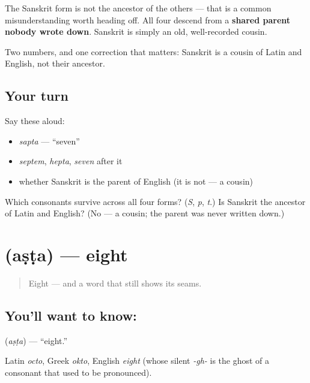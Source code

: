 The Sanskrit form is not the ancestor of the others — that is a common misunderstanding worth heading off. All four descend from a \textbf{shared parent nobody wrote down}. Sanskrit is simply an old, well-recorded cousin.

\begin{grammarlens}[title={What you've built}]
Two numbers, and one correction that matters: Sanskrit is a cousin of Latin and English, not their ancestor.
\end{grammarlens}

\subsection*{Your turn}
Say these aloud:

\begin{itemize}
\raggedright
  \item \emph{sapta} — \textquotedblleft{}seven\textquotedblright{}
  \item \emph{septem}, \emph{hepta}, \emph{seven} after it
  \item whether Sanskrit is the parent of English (it is not — a cousin)
\end{itemize}

\begin{tcolorbox}[breakable,colback=teal!4,colframe=teal!35!black,title={Before you move on}]
Which consonants survive across all four forms? (\emph{S}, \emph{p}, \emph{t}.) Is Sanskrit the ancestor of Latin and English? (No — a cousin; the parent was never written down.)
\end{tcolorbox}
\section[\texorpdfstring{\sk{अष्ट} (aṣṭa)}{अष्ट (aṣṭa)}]{ (aṣṭa) — eight}

\label{lesson:SA-C19-eight}



\begin{quote}
Eight — and a word that still shows its seams.
\end{quote}

\subsection*{You'll want to know: }
\textbf{} (\emph{aṣṭa}) — \textquotedblleft{}eight.\textquotedblright{}

Latin \emph{octo}, Greek \emph{okto}, English \emph{eight} (whose silent \emph{-gh-} is the ghost of a consonant that used to be pronounced).

